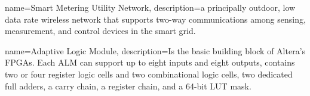 {
  name=Smart Metering Utility Network,
  description={a principally outdoor, low data rate wireless network that supports two-way communications among sensing, measurement, and control devices in the smart grid.}
}

{
  name=Adaptive Logic Module,
  description={Is the basic building block of Altera's FPGAs. Each ALM can support up to eight inputs and eight outputs, contains two or four register logic cells and two combinational logic cells, two dedicated full adders, a carry chain, a register chain, and a 64-bit LUT mask.}
}
